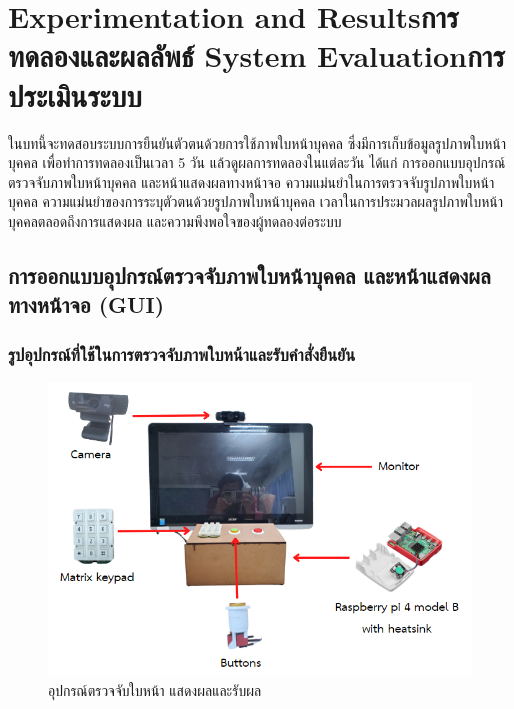 \chapter{\ifproject%
\ifenglish Experimentation and Results\else การทดลองและผลลัพธ์\fi
\else%
\ifenglish System Evaluation\else การประเมินระบบ\fi
\fi}

ในบทนี้จะทดสอบระบบการยืนยันตัวตนด้วยการใช้ภาพใบหน้าบุคคล ซึ่งมีการเก็บข้อมูลรูปภาพใบหน้าบุคคล เพื่อทำการทดลองเป็นเวลา 5 วัน แล้วดูผลการทดลองในแต่ละวัน ได้แก่ การออกแบบอุปกรณ์ตรวจจับภาพใบหน้าบุคคล และหน้าแสดงผลทางหน้าจอ
ความแม่นยำในการตรวจจับรูปภาพใบหน้าบุคคล ความแม่นยำของการระบุตัวตนด้วยรูปภาพใบหน้าบุคคล เวลาในการประมวลผลรูปภาพใบหน้าบุคคลตลอดถึงการแสดงผล 
และความพึงพอใจของผู้ทดลองต่อระบบ

\section{การออกแบบอุปกรณ์ตรวจจับภาพใบหน้าบุคคล และหน้าแสดงผลทางหน้าจอ (GUI)}

\subsection{รูปอุปกรณ์ที่ใช้ในการตรวจจับภาพใบหน้าและรับคำสั่งยืนยัน}

\begin{figure}[!ht]
  \begin{center}
    \includegraphics[scale=.6]{pic/overall_module.png}
    \caption[อุปกรณ์ตรวจจับใบหน้า แสดงผลและรับผล]{อุปกรณ์ตรวจจับใบหน้า แสดงผลและรับผล}
    \label{fig:module_pi}
  \end{center}
\end{figure}


